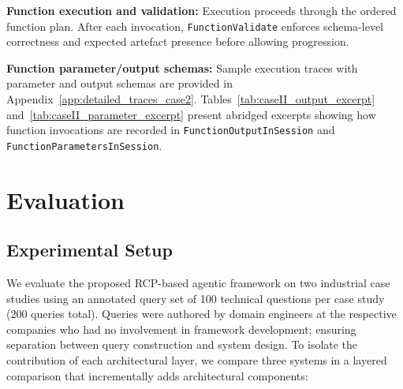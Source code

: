 \documentclass[largeformat]{interact}
\begin{document}
\noindent \textbf{Function execution and validation:}
Execution proceeds through the ordered function plan. After each invocation, \texttt{FunctionValidate} enforces schema-level correctness and expected artefact presence before allowing progression.

\noindent \textbf{Function parameter/output schemas:}
Sample execution traces with parameter and output schemas are provided in Appendix~\ref{app:detailed_traces_case2}. Tables~\ref{tab:caseII_output_excerpt} and~\ref{tab:caseII_parameter_excerpt} present abridged excerpts showing how function invocations are recorded in \texttt{FunctionOutputInSession} and \texttt{FunctionParametersInSession}.



\section{Evaluation}
\label{sec:evaluation}
\subsection{Experimental Setup}
\label{subsec:experimental_setup}
We evaluate the proposed RCP-based agentic framework on two industrial case studies using an annotated query set of 100 technical questions per case study (200 queries total). Queries were authored by domain engineers at the respective companies who had no involvement in framework development; ensuring separation between query construction and system design. To isolate the contribution of each architectural layer, we compare three systems in a layered comparison that incrementally adds architectural components:
\end{document}
